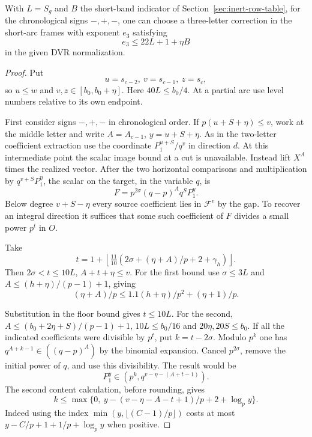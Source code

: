 \begin{lemma}\label{lem:three-letter-negative-lift}
With \(L=S_g\) and \(B\) the short-band indicator of Section~\ref{sec:inert-row-table},
for the chronological signs \(-,+,-\), one can choose a three-letter correction in the short-arc frames with exponent \(e_3\) satisfying
\[
 e_3\le22L+1+\eta B
\]
in the given DVR normalization.
\end{lemma}

\begin{proof}
\label{par:short-three-levels}
Put
\[
 u=s_{c-2},\ v=s_{c-1},\ z=s_c,
\]
so \(u\le w\)
and \(v,z\in[b_0,b_0+\eta]\). Here \(40L\le b_0/4\).
At a partial arc use level numbers relative to its own endpoint.

First consider signs \(-,+,-\) in chronological order.
If \(p(u+S+\eta)\le v\), work at the middle letter and
write \(A=A_{c-1}\), \(y=u+S+\eta\).
As in the two-letter coefficient extraction use the coordinate
\(P_1^{u+S}/q^v\) in direction \(d\). At this intermediate
point the scalar image bound at a cut is unavailable. Instead
lift \(X^A\) times the realized vector. After the two horizontal
comparisons and multiplication by \(q^{v+S}P_1^\eta\), the
scalar on the target, in the variable \(q\), is
\[
 F=p^{2\sigma}(q-p)^A q^S P_1^y .
\]
Below degree \(v+S-\eta\) every source coefficient lies in
\(\mathcal F^v\) by the gap. To recover an integral direction
it suffices that some such coefficient of \(F\) divides a small
power \(p^t\) in \(O\).

Take
\[
 t=1+\left\lfloor\tfrac{11}{10}
 (2\sigma+(\eta+A)/p+2+\gamma_h)\right\rfloor .
\]
Then \(2\sigma<t\le10L\), \(A+t+\eta\le v\).
For the first bound use \(\sigma\le3L\) and
\(A\le (h+\eta)/(p-1)+1\), giving
\[
 (\eta+A)/p\le 1.1(h+\eta)/p^2+(\eta+1)/p.
\]

Substitution in the floor bound gives \(t\le10L\).
For the second, \(A\le (b_0+2\eta+S)/(p-1)+1\),
\(10L\le b_0/16\) and \(20\eta,20S\le b_0\).
If all the indicated coefficients were divisible by \(p^t\),
put \(k=t-2\sigma\). Modulo \(p^k\) one has
\(q^{A+k-1}\in((q-p)^A)\) by the binomial expansion.
Cancel \(p^{2\sigma}\), remove the initial power of \(q\),
and use this divisibility. The result would be
\[
 P_1^y\in(p^k,q^{v-\eta-(A+t-1)}).
\]
The second content calculation, before rounding, gives
\[
 k\le\max\{0,\ y-(v-\eta-A-t+1)/p+2+\log_p y\}.
\]
Indeed using the index \(\min(y,\lfloor(C-1)/p\rfloor)\)
costs at most \(y-C/p+1+1/p+\log_p y\) when positive.


\end{proof}
